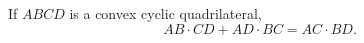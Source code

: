 \begin{theorem}
    \label{thm: ptolemy}
    If $ABCD$ is a convex cyclic quadrilateral,
    \[ AB \cdot CD + AD \cdot BC = AC \cdot BD. \]
\end{theorem}